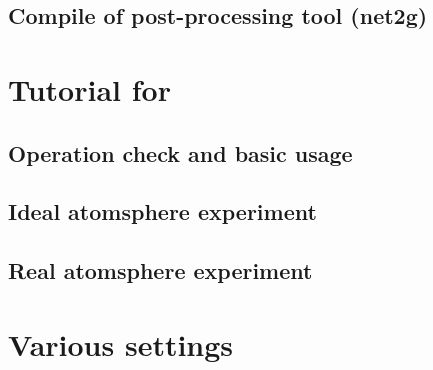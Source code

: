 \documentclass[a4paper]{report}
\begin{document}
 \chapter{Compile of post-processing tool (net2g)}
 


\part{Tutorial for \scalerm}
 \chapter{Operation check and basic usage} \label{chap:tutorial_ideal}
 
 
 
 

 \chapter{Ideal atomsphere experiment} %

 \chapter{Real atomsphere experiment} \label{chap:tutorial_real}
 
 
 
 
 
 
 


% 
% 
% 


\part{Various settings} \label{part:basic_usel}
\end{document}
